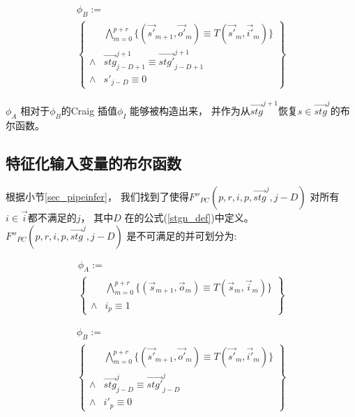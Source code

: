 \begin{multline}
\phi_B := \\
\left\{
\begin{array}{cc}
&\bigwedge_{m=0}^{p+r}
\{
(\vec{s'}_{m+1},\vec{o'}_m)\equiv T(\vec{s'}_m,\vec{i'}_m)
\}
\\
\wedge&\vec{stg}^{j+1}_{j-D+1}\equiv \vec{stg'}^{j+1}_{j-D+1} \\
\wedge& s'_{j-D}\equiv 0
\end{array}
\right\}
\end{multline}

$\phi_A$ 相对于$\phi_B$的Craig 插值$\phi_I$  能够被构造出来，
并作为从$\vec{stg}^{j+1}$恢复$s\in \vec{stg}^{j}$的布尔函数。

\subsection{特征化输入变量的布尔函数}

根据小节\ref{sec_pipeinfer}，
我们找到了使得$F''_{PC}(p,r,i,p,\vec{stg}^{j},j-D)$ 对所有$i\in \vec{i}$都不满足的$j$，
其中$D$ 在的公式(\ref{stgn_def})中定义。
$F''_{PC}(p,r,i,p,\vec{stg}^{j},j-D)$ 是不可满足的并可划分为:

\begin{multline}
\phi_A:=\\
\left\{
\begin{array}{cc}
&\bigwedge_{m=0}^{p+r}
\{
(\vec{s}_{m+1},\vec{o}_m)\equiv T(\vec{s}_m,\vec{i}_m)
\}
\\
\wedge& i_{p}\equiv 1
\end{array}
\right\}
\end{multline}

\begin{multline}
\phi_B:=\\
\left\{
\begin{array}{cc}
&\bigwedge_{m=0}^{p+r}
\{
(\vec{s'}_{m+1},\vec{o'}_m)\equiv T(\vec{s'}_m,\vec{i'}_m)
\}
\\
\wedge&\vec{stg}^j_{j-D}\equiv \vec{stg'}^j_{j-D} \\
\wedge& i'_{p}\equiv 0
\end{array}
\right\}
\end{multline}

